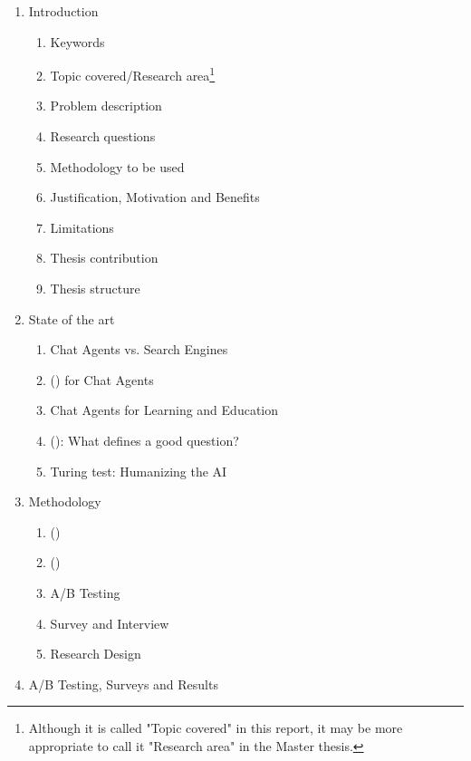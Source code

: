 \begin{enumerate}[label*=\arabic*.]
	\item Introduction	
	\begin{enumerate}[label*=\arabic*.]
		\item Keywords
		\item Topic covered/Research area\footnote{Although it is called "Topic covered" in this report, it may be more appropriate to call it "Research area" in the Master thesis.}
		\item Problem description
		\item Research questions
		\item Methodology to be used
		\item Justification, Motivation and Benefits
		\item Limitations
		\item Thesis contribution
		\item Thesis structure
	\end{enumerate}
	\item State of the art
	\begin{enumerate}[label*=\arabic*.]
		\item Chat Agents vs. Search Engines
		\item {} () for Chat Agents
		\item Chat Agents for Learning and Education
		\item {} (): What defines a good question?
		\item Turing test: Humanizing the AI
	\end{enumerate}
	\item Methodology
	\begin{enumerate}[label*=\arabic*.]
		\item {} ()
		\item {} ()
		\item A/B Testing
		\item Survey and Interview
		\item Research Design 
	\end{enumerate}
	\item A/B Testing, Surveys and Results
	\begin{enumerate}[label*=\arabic*.]

\end{enumerate}
\end{enumerate}
